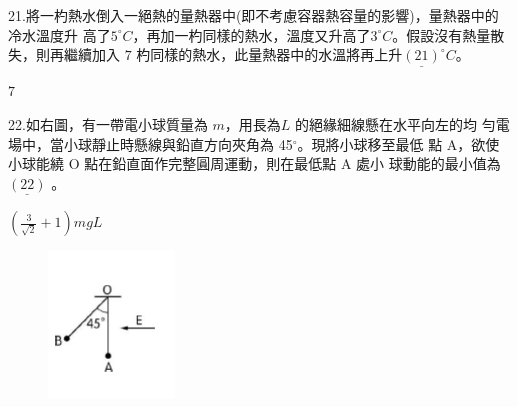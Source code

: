 \documentclass[cn,10pt,math=newtx]{elegantbook}
\begin{document}
\begin{example}
   21.將一杓熱水倒入一絕熱的量熱器中(即不考慮容器熱容量的影響)，量熱器中的冷水溫度升
高了$5^\circ C$，再加一杓同樣的熱水，溫度又升高了$3^\circ C$。假設沒有熱量散失，則再繼續加入 $7$
杓同樣的熱水，此量熱器中的水溫將再上升$\underline{(21)}^\circ C$。\\
    \rightline{[文華高中教甄109]}
\end{example}
\begin{solution}
    $7$
\end{solution}

\newpage


\begin{example}
   22.如右圖，有一帶電小球質量為 $m$，用長為$L$ 的絕緣細線懸在水平向左的均
勻電場中，當小球靜止時懸線與鉛直方向夾角為 45$^\circ$。現將小球移至最低
點 A，欲使小球能繞 O 點在鉛直面作完整圓周運動，則在最低點 A 處小
球動能的最小值為$\underline{(22)}$  。\\
    \rightline{[文華高中教甄109]}
\end{example}
\begin{solution}
    $(\frac{3}{\sqrt{2}}+1) mgL$
\end{solution}
\begin{figure}[htbp]
    \flushright
    \includegraphics[width=0.3\textwidth]{image/109文華22.png}
  \end{figure}
\newpage
\end{document}
